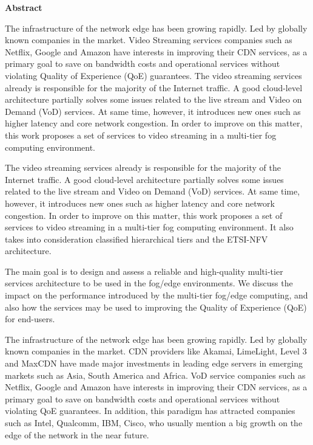 \begin{center}
	{\bf Abstract}
\end{center}
	

The infrastructure of the network edge has been growing rapidly. Led by globally known companies in the market. Video Streaming services companies such as Netflix, Google and Amazon have interests in improving their CDN services, as a primary goal to save on bandwidth costs and operational services without violating Quality of Experience (QoE) guarantees. The video streaming services already is responsible for the majority of the Internet traffic. A good cloud-level architecture partially solves some issues related to the live stream and Video on Demand (VoD) services.  At same time, however, it introduces new ones such as higher latency and core network congestion. 
In order to improve on this matter, this work proposes a set of services to video streaming in a multi-tier fog computing environment.

The video streaming services already is responsible for the majority of the Internet traffic. A good cloud-level architecture partially solves some issues related to the live stream and Video on Demand (VoD) services.  At same time, however, it introduces new ones such as higher latency and core network congestion. In order to improve on this matter, this work proposes a set of services to video streaming in a multi-tier fog computing environment. It also takes into consideration classified hierarchical tiers and the ETSI-NFV architecture.

The main goal is to design and assess a reliable and high-quality multi-tier services architecture to be used in the fog/edge environments.
We discuss the impact on the performance introduced by the multi-tier fog/edge computing, and also how the services may be used to improving the Quality of Experience (QoE) for end-users.
	
The infrastructure of the network edge has been growing rapidly. Led by globally known companies in the market. CDN providers like Akamai, LimeLight, Level 3 and MaxCDN have made major investments in leading edge servers in emerging markets such as Asia, South America and Africa. VoD service companies such as Netflix, Google and Amazon have interests in improving their CDN services, as a primary goal to save on bandwidth costs and operational services without violating QoE guarantees. In addition, this paradigm has attracted companies such as Intel, Qualcomm, IBM, Cisco, who usually mention a big growth on the edge of the network in the near future.

